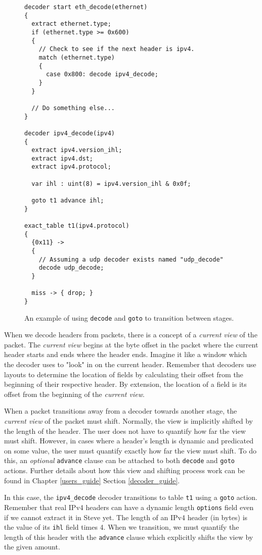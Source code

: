 \begin{figure}
\begin{lstlisting}
decoder start eth_decode(ethernet)
{
  extract ethernet.type;
  if (ethernet.type >= 0x600) 
  {
  	// Check to see if the next header is ipv4.
    match (ethernet.type)
    {
      case 0x800: decode ipv4_decode;
    }
  }
  
  // Do something else...
}

decoder ipv4_decode(ipv4)
{
  extract ipv4.version_ihl;
  extract ipv4.dst;
  extract ipv4.protocol;
  
  var ihl : uint(8) = ipv4.version_ihl & 0x0f;
  
  goto t1 advance ihl;
}

exact_table t1(ipv4.protocol)
{
  {0x11} ->
  {
    // Assuming a udp decoder exists named "udp_decode"
    decode udp_decode;
  }
  
  miss -> { drop; }
}
\end{lstlisting}
\caption{An example of using \texttt{decode} and \texttt{goto} to transition between stages.}
\label{fg:transition_ex}
\end{figure}

When we decode headers from packets, there is a concept of a \textit{current view} of the packet. The \textit{current view} begins at the byte offset in the packet where the current header starts and ends where the header ends. Imagine it like a window which the decoder uses to "look" in on the current header. Remember that decoders use layouts to determine the location of fields by calculating their offset from the beginning of their respective header. By extension, the location of a field is its offset from the beginning of the \textit{current view}. 

When a packet transitions away from a decoder towards another stage, the \textit{current view} of the packet must shift. Normally, the view is implicitly shifted by the length of the header. The user does not have to quantify how far the view must shift. However, in cases where a header's length is dynamic and predicated on some value, the user must quantify exactly how far the view must shift. To do this, an \textit{optional} \texttt{advance} clause can be attached to both \texttt{decode} and \texttt{goto} actions. Further details about how this view and shifting process work can be found in Chapter \ref{users_guide} Section \ref{decoder_guide}.

In this case, the \texttt{ipv4\_decode} decoder transitions to table \texttt{t1} using a \texttt{goto} action. Remember that real IPv4 headers can have a dynamic length \texttt{options} field even if we cannot extract it in Steve yet. The length of an IPv4 header (in bytes) is the value of its \texttt{ihl} field times 4. When we transition, we must quantify the length of this header with the \texttt{advance} clause which explicitly shifts the view by the given amount.


